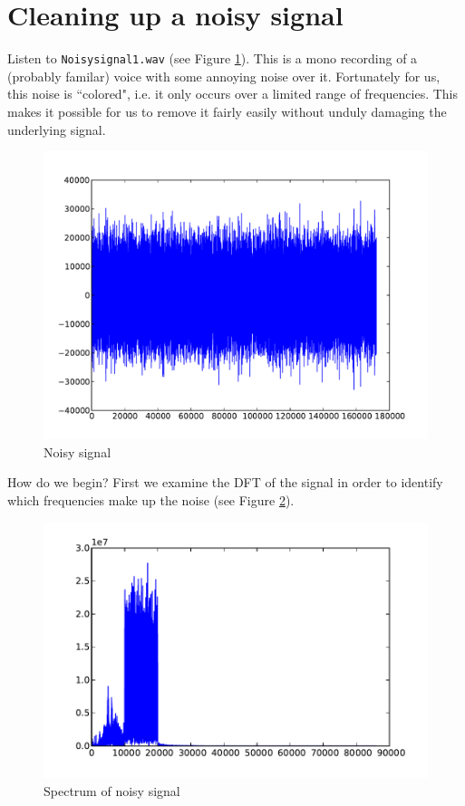 
\section*{Cleaning up a noisy signal}

Listen to \texttt{Noisysignal1.wav} (see Figure \ref{noisysignal}). This is a mono recording of a (probably familar) voice with some annoying noise over it. Fortunately for us, this noise is ``colored", i.e. it only occurs over a limited range of frequencies. This makes it possible for us to remove it fairly easily without unduly damaging the underlying signal.
\begin{figure}[ht]\caption{Noisy signal}\label{noisysignal}\centering\includegraphics[width=\textwidth]{noisy}\end{figure}
How do we begin? First we examine the DFT of the signal in order to identify which frequencies make up the noise (see Figure \ref{noisyspec}).
\begin{figure}[ht]\caption{Spectrum of noisy signal}\label{noisyspec}\centering\includegraphics[width=\textwidth]{noisyspec}\end{figure}
